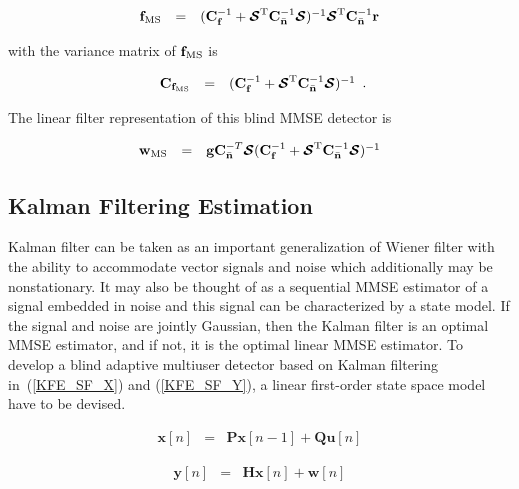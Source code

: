 \documentclass[a4paper,11pt,fleqn]{article}
\newcommand{\br}{{\mathbf r}}
\newcommand{\bC}{{\bf C}}
\newcommand{\bg}{{\bf g}}
\newcommand{\bn}{{\bf n}}
\newcommand{\bw}{{\bf w}}
\newcommand{\bbf}{{\bf f}}
\newcommand{\bcS}{{\mbox {\boldmath ${\cal S}$}}}
\begin{document}
\begin{equation}
\begin{array}{rcl}
{\bbf}_{\rm MS} &=& (\bC_{\bbf}^{-1}+\bcS^{\rm
T}\bC_{\bar{\bn}}^{-1}\bcS)^{-1}\bcS^{\rm
T}\bC_{\bar{\bn}}^{-1}\br
\end{array} \label{MSE}
\end{equation}

\noindent with the variance matrix of ${\bbf}_{\rm MS}$ is

\begin{equation}
\begin{array}{rcl}
\bC_{{\bbf_{\rm MS}}} &=& (\bC_{\bbf}^{-1}+\bcS^{\rm
T}\bC_{\bar{\bn}}^{-1}\bcS)^{-1}
\end{array}.
\end{equation}

The linear filter representation of this blind MMSE detector is

\begin{equation}
\begin{array}{rcl}
{\bw}_{\rm MS} &=&\bg
\bC_{\bar{\bn}}^{-T}\bcS(\bC_{\bbf}^{-1}+\bcS^{\rm
T}\bC_{\bar{\bn}}^{-1}\bcS)^{-1}
\end{array} \label{w_MSE}
\end{equation}


\subsection{Kalman Filtering Estimation}
Kalman filter can be taken as an important generalization of
Wiener filter with the ability to accommodate vector signals and
noise which additionally may be nonstationary. It may also be
thought of as a sequential MMSE estimator of a signal embedded in
noise and this signal can be characterized by a state model. If
the signal and noise are jointly Gaussian, then the Kalman filter
is an optimal MMSE estimator, and if not, it is the optimal linear
MMSE estimator. To develop a blind adaptive multiuser detector
based on Kalman filtering in~(\ref{KFE_SF_X}) and
(\ref{KFE_SF_Y}), a linear first-order state space model have to
be devised.


\begin{equation}
\begin{array}{rcl}
\mathbf{x}[n]&=&\mathbf{P}\mathbf{x}[n-1] +
\mathbf{Q}\mathbf{u}[n]
\end{array} \label{KFE_SF_X}
\end{equation}

\begin{equation}
\begin{array}{rcl}
\mathbf{y}[n]&=&\mathbf{H}\mathbf{x}[n] + \mathbf{w}[n]
\end{array} \label{KFE_SF_Y}
\end{equation}






\end{document}
